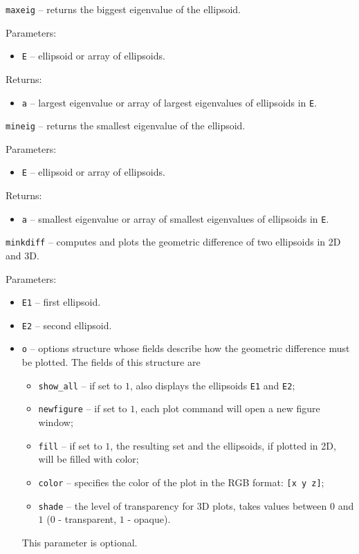 \newpage

{\Large {\tt maxeig}} -- returns the biggest eigenvalue of the ellipsoid.

Parameters:
\begin{itemize}
\item {\tt E} -- ellipsoid or array of ellipsoids.
\end{itemize}

Returns:
\begin{itemize}
\item {\tt a} -- largest eigenvalue or array of largest eigenvalues of
ellipsoids in {\tt E}.
\end{itemize}

\newpage

{\Large {\tt mineig}} -- returns the smallest eigenvalue of the ellipsoid.

Parameters:
\begin{itemize}
\item {\tt E} -- ellipsoid or array of ellipsoids.
\end{itemize}

Returns:
\begin{itemize}
\item {\tt a} -- smallest eigenvalue or array of smallest eigenvalues of
ellipsoids in {\tt E}.
\end{itemize}

\newpage

{\Large {\tt minkdiff}} -- computes and plots the geometric difference of
two ellipsoids in 2D and 3D.

Parameters:
\begin{itemize}
\item {\tt E1} -- first ellipsoid.
\item {\tt E2} -- second ellipsoid.
\item {\tt o} -- options structure whose fields describe how the geometric
difference must be plotted. The fields of this structure are
\begin{itemize}
\item {\tt show\_all} -- if set to $1$, also displays the ellipsoids
{\tt E1} and {\tt E2};
\item {\tt newfigure} -- if set to $1$, each plot command will open a new
figure window;
\item {\tt fill} -- if set to $1$, the resulting set and the ellipsoids,
if plotted in 2D, will be filled with color;
\item {\tt color} -- specifies the color of the plot in the RGB format:
{\tt [x y z]};
\item {\tt shade} -- the level of transparency for 3D plots, takes values
between $0$ and $1$ ($0$ - transparent, $1$ - opaque).
\end{itemize}
This parameter is optional.
\end{itemize}

